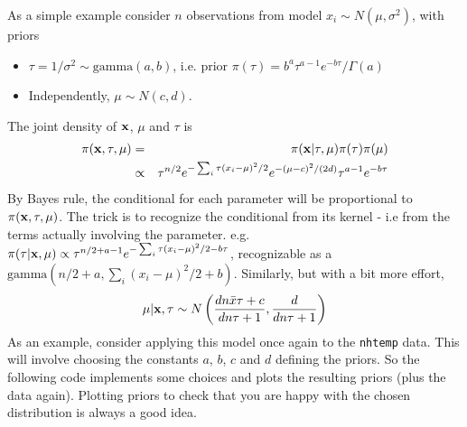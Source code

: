 \documentclass[10pt] {article}
\theoremstyle{definition}
\begin{document}
As a simple example consider $n$ observations from model $x_i \sim N(\mu, \sigma^2)$, with priors
\begin{itemize}
\item $\tau = 1/\sigma^2 \sim \text{gamma}(a,b)$, i.e. prior $\pi(\tau) = b^a \tau^{a-1} e^{-b\tau}/\Gamma(a)$ 
\item Independently, $\mu \sim N(c,d)$.
\end{itemize} 
The joint density of $\bf x$, $\mu$ and $\tau$ is
\begin{eqnarray*}
\pi({\bf x},\tau,\mu) &=& \pi({\bf x}|\tau,\mu)\pi(\tau)\pi(\mu) \\&\propto& \tau^{n/2} e^{-\sum_i \tau(x_i-\mu)^2/2} e^{-(\mu-c)^2/(2d)} \tau^{a-1} e^{-b\tau}
\end{eqnarray*}
By Bayes rule, the conditional for each parameter will be proportional to $\pi({\bf x},\tau,\mu)$. The trick is to recognize the conditional from its kernel - i.e from the terms actually involving the parameter. e.g. $ \pi(\tau|{\bf x},\mu) \propto \tau^{n/2+a-1}e^{-\sum_i \tau(x_i-\mu)^2/2 - b\tau} $,  recognizable as a $\text{gamma}(n/2+a,\sum_i (x_i-\mu)^2/2 + b)$. Similarly, but with a bit more effort, 
$$
\mu|{\bf x},\tau \sim N \left (\frac{dn\bar x\tau + c}{dn\tau + 1}, \frac{d}{dn\tau+1} \right )
$$
As an example, consider applying this model once again to the {\tt nhtemp} data. This will involve choosing the constants $a$, $b$, $c$ and $d$ defining the priors. So the following code implements some choices and plots the resulting priors (plus the data again). Plotting priors to check that you are happy with the chosen distribution is always a good idea. 
\end{document}
